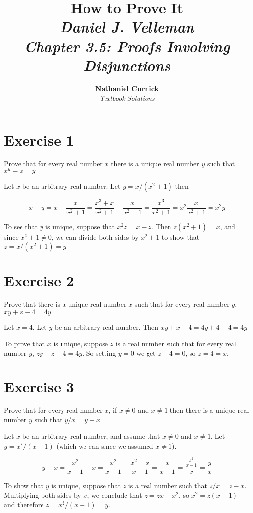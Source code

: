 \documentclass[11pt]{article}
\title{\textbf{How to Prove It} \\ {\Large\itshape Daniel J. Velleman} \\ {\Large\itshape Chapter 3.5: Proofs Involving Disjunctions}}
\author{\textbf{Nathaniel Curnick} \\ \textit{Textbook Solutions}}
\date{}
\begin{document}
\maketitle

\section*{Exercise 1}

Prove that for every real number $x$ there is a unique real number $y$ such that 
$x^y = x - y$

Let $x$ be an arbitrary real number. Let $y = x / (x^2 + 1)$ then 

$$x - y =
x - \frac{x}{x^2 + 1} =
\frac{x^3 + x}{x^2 + 1} - \frac{x}{x^2 + 1} =
\frac{x^3}{x^2 + 1} =
x^2 \frac{x}{x^2 + 1} =
x^2 y$$

To see that $y$ is unique, suppose that $x^2 z = x - z$. Then $z(x^2 + 1) = x$,
and since $x^2 + 1 \neq 0$, we can divide both sides by $x^2 + 1$ to show that 
$z = x / (x^2 + 1) = y$

\section*{Exercise 2}

Prove that there is a unique real number $x$ such that for every real number 
$y$, $xy + x - 4 = 4y$

Let $x = 4$. Let $y$ be an arbitrary real number. Then 
$xy + x - 4 = 4y + 4 - 4 = 4y$

To prove that $x$ is unique, suppose $z$ is a real number such that for every 
real number $y$, $zy + z - 4 = 4y$. So setting $y = 0$ we get $z - 4 = 0$,
so $z = 4 = x$.

\section*{Exercise 3}

Prove that for every real number $x$, if $x \neq 0$ and $x \neq 1$ then there is 
a unique real number $y$ such that $y/x = y - x$ 

Let $x$ be an arbitrary real number, and assume that $x \neq 0$ and $x \neq 1$.
Let $y = x^2 / (x-1)$ (which we can since we assumed $x \neq 1$).

$$y - x = 
\frac{x^2}{x - 1} - x =
\frac{x^2}{x-1} - \frac{x^2 - x}{x - 1} =
\frac{x}{x - 1} =
\frac{\frac{x^2}{x-1}}{x} =
\frac{y}{x}$$

To show that $y$ is unique, suppose that $z$ is a real number such that 
$z/x = z - x$. Multiplying both sides by $x$, we conclude that 
$z = zx - x^2$, so $x^2 = z(x-1)$ and therefore $z = x^2/(x-1) = y$.
\end{document}
